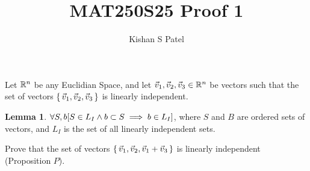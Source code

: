\documentclass{exam}
\theoremstyle{plain}
\theoremstyle{definition}
\newtheorem{lemma}{Lemma}
\begin{document}
\title{MAT250S25 Proof 1}
\author{Kishan S Patel}
\maketitle



Let ${\mathbb R}^n$ be any Euclidian Space, and let $\vec v_1, \vec v_2, \vec v_3 \in {\mathbb R}^n$ be vectors such that the set
of vectors $\set{\vec v_1, \vec v_2, \vec v_3}$ is linearly independent.

\begin{lemma}
	$\forall S,b { \left[ { S \in L_I \wedge b \subset S  \implies b \in L_I} \right] } $, where $S$ and $B$ are ordered sets of vectors, and $L_I$ is the set of all linearly independent sets.

	\label{subset}
\end{lemma}

Prove that the set of vectors $\set{\vec v_1, \vec v_2, \vec v_1 + \vec v_3}$ is linearly independent (Proposition $P$).

\renewcommand\qedsymbol{QED}
\end{document}
